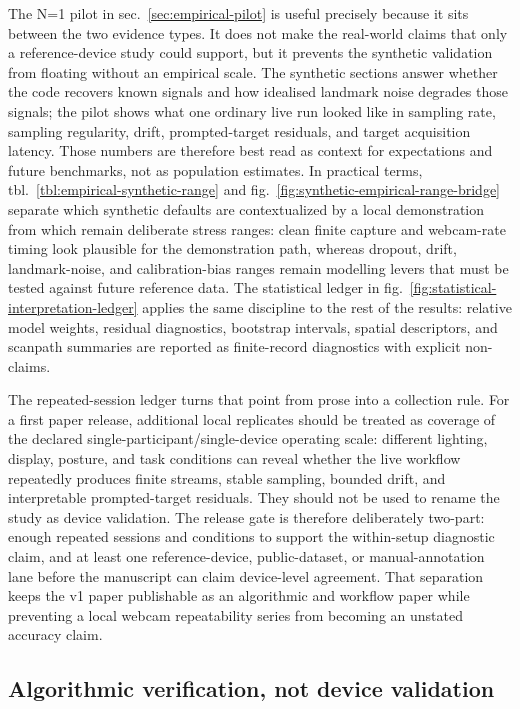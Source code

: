 \documentclass[
]{article}
\begin{document}
The N=1 pilot in sec.~\ref{sec:empirical-pilot} is useful precisely
because it sits between the two evidence types. It does not make the
real-world claims that only a reference-device study could support, but
it prevents the synthetic validation from floating without an empirical
scale. The synthetic sections answer whether the code recovers known
signals and how idealised landmark noise degrades those signals; the
pilot shows what one ordinary live run looked like in sampling rate,
sampling regularity, drift, prompted-target residuals, and target
acquisition latency. Those numbers are therefore best read as context
for expectations and future benchmarks, not as population estimates. In
practical terms, tbl.~\ref{tbl:empirical-synthetic-range} and
fig.~\ref{fig:synthetic-empirical-range-bridge} separate which synthetic
defaults are contextualized by a local demonstration from which remain
deliberate stress ranges: clean finite capture and webcam-rate timing
look plausible for the demonstration path, whereas dropout, drift,
landmark-noise, and calibration-bias ranges remain modelling levers that
must be tested against future reference data. The statistical ledger in
fig.~\ref{fig:statistical-interpretation-ledger} applies the same
discipline to the rest of the results: relative model weights, residual
diagnostics, bootstrap intervals, spatial descriptors, and scanpath
summaries are reported as finite-record diagnostics with explicit
non-claims.

The repeated-session ledger turns that point from prose into a
collection rule. For a first paper release, additional local replicates
should be treated as coverage of the declared
single-participant/single-device operating scale: different lighting,
display, posture, and task conditions can reveal whether the live
workflow repeatedly produces finite streams, stable sampling, bounded
drift, and interpretable prompted-target residuals. They should not be
used to rename the study as device validation. The release gate is
therefore deliberately two-part: enough repeated sessions and conditions
to support the within-setup diagnostic claim, and at least one
reference-device, public-dataset, or manual-annotation lane before the
manuscript can claim device-level agreement. That separation keeps the
v1 paper publishable as an algorithmic and workflow paper while
preventing a local webcam repeatability series from becoming an unstated
accuracy claim.

\subsection{Algorithmic verification, not device
validation}\label{algorithmic-verification-not-device-validation}
\end{document}
